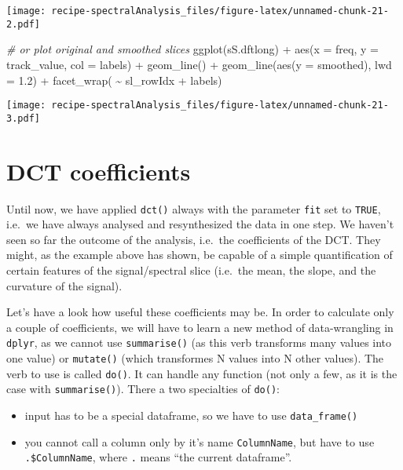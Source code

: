 \documentclass[
]{book}
\newenvironment{Shaded}{\begin{snugshade}}{\end{snugshade}}
\newcommand{\AttributeTok}[1]{\textcolor[rgb]{0.77,0.63,0.00}{#1}}
\newcommand{\CommentTok}[1]{\textcolor[rgb]{0.56,0.35,0.01}{\textit{#1}}}
\newcommand{\FloatTok}[1]{\textcolor[rgb]{0.00,0.00,0.81}{#1}}
\newcommand{\FunctionTok}[1]{\textcolor[rgb]{0.00,0.00,0.00}{#1}}
\newcommand{\NormalTok}[1]{#1}
\newcommand{\SpecialCharTok}[1]{\textcolor[rgb]{0.00,0.00,0.00}{#1}}
\providecommand{\tightlist}{%
  \setlength{\itemsep}{0pt}\setlength{\parskip}{0pt}}
\begin{document}
\texttt{[image: recipe-spectralAnalysis\_files/figure-latex/unnamed-chunk-21-2.pdf]}

\begin{Shaded}
\begin{Highlighting}[]
\CommentTok{\# or plot original and smoothed slices}
\FunctionTok{ggplot}\NormalTok{(sS.dftlong) }\SpecialCharTok{+}
  \FunctionTok{aes}\NormalTok{(}\AttributeTok{x =}\NormalTok{ freq, }\AttributeTok{y =}\NormalTok{ track\_value, }\AttributeTok{col =}\NormalTok{ labels) }\SpecialCharTok{+}
  \FunctionTok{geom\_line}\NormalTok{() }\SpecialCharTok{+}
  \FunctionTok{geom\_line}\NormalTok{(}\FunctionTok{aes}\NormalTok{(}\AttributeTok{y =}\NormalTok{ smoothed), }\AttributeTok{lwd =} \FloatTok{1.2}\NormalTok{) }\SpecialCharTok{+}
  \FunctionTok{facet\_wrap}\NormalTok{( }\SpecialCharTok{\textasciitilde{}}\NormalTok{ sl\_rowIdx }\SpecialCharTok{+}\NormalTok{ labels)}
\end{Highlighting}
\end{Shaded}

\texttt{[image: recipe-spectralAnalysis\_files/figure-latex/unnamed-chunk-21-3.pdf]}

\hypertarget{dct-coefficients}{%
\section{DCT coefficients}\label{dct-coefficients}}

Until now, we have applied \texttt{dct()} always with the parameter \texttt{fit} set to \texttt{TRUE}, i.e.~we have always analysed and resynthesized the data in one step. We haven't seen so far the outcome of the analysis, i.e.~the coefficients of the DCT. They might, as the example above has shown, be capable of a simple quantification of certain features of the signal/spectral slice (i.e.~the mean, the slope, and the curvature of the signal).

Let's have a look how useful these coefficients may be. In order to calculate only a couple of coefficients, we will have to learn a new method of data-wrangling in \texttt{dplyr}, as we cannot use \texttt{summarise()} (as this verb transforms many values into one value) or \texttt{mutate()} (which transformes N values into N other values). The verb to use is called \texttt{do()}. It can handle any function (not only a few, as it is the case with \texttt{summarise()}). There a two specialties of \texttt{do()}:

\begin{itemize}
\tightlist
\item
  input has to be a special dataframe, so we have to use \texttt{data\_frame()}
\item
  you cannot call a column only by it's name \texttt{ColumnName}, but have to use \texttt{.\$ColumnName}, where \texttt{.} means ``the current dataframe''.
\end{itemize}
\end{document}
